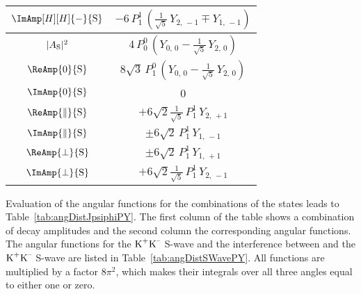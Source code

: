 \begin{table}[p]
\begin{tabular}{cc}
    $\ImAmp[H][H]{-}{{\text{S}}}$  &
      $-6\, P_1^1\, (\tfrac{1}{\sqrt{5}}\, Y_{2,\,-1} \mp Y_{1,\,-1})$  \\
    \hline\hline

    $|{A}_{{\text{S}}}|^2$  &
      $4\, P_0^0\, (Y_{0,\,0} - \tfrac{1}{\sqrt{5}}\, Y_{2,\,0})$  \\
    \hline

    $\ReAmp{0}{{\text{S}}}$  &
      $8\sqrt{3}\, P_1^0\, (Y_{0,\,0} - \tfrac{1}{\sqrt{5}}\, Y_{2,\,0})$  \\
    \hline

    $\ImAmp{0}{{\text{S}}}$  &
      0  \\
    \hline

    $\ReAmp{\parallel}{{\text{S}}}$  &
      $+6\sqrt{2}\tfrac{1}{\sqrt{5}}\, P_1^1\, Y_{2,\,+1}$  \\
    \hline

    $\ImAmp{\parallel}{{\text{S}}}$  &
      $\pm 6\sqrt{2}\, P_1^1\, Y_{1,\,-1}$  \\
    \hline

    $\ReAmp{\perp}{{\text{S}}}$  &
      $\pm 6\sqrt{2}\, P_1^1\, Y_{1,\,+1}$  \\
    \hline

    $\ImAmp{\perp}{{\text{S}}}$  &
      $+6\sqrt{2}\tfrac{1}{\sqrt{5}}\, P_1^1\, Y_{2,\,-1}$  \\
    \hline
  \end{tabular}
\end{table}

Evaluation of the angular functions for the combinations of the \BstoJpsiphi{} states leads to Table~\ref{tab:angDistJpsiphiPY}. The first
column of the table shows a combination of decay amplitudes and the second column the corresponding angular functions. The angular
functions for the $\text{K}^\text{+}\text{K}^\text{--}$ S-wave and the interference between \BstoJpsiphi{} and the $\text{K}^\text{+}\text{K}^\text{--}$ S-wave are listed in
Table~\ref{tab:angDistSWavePY}. All functions are multiplied by a factor 8$\pi^\text{2}$, which makes their integrals over all three angles
equal to either one or zero.

